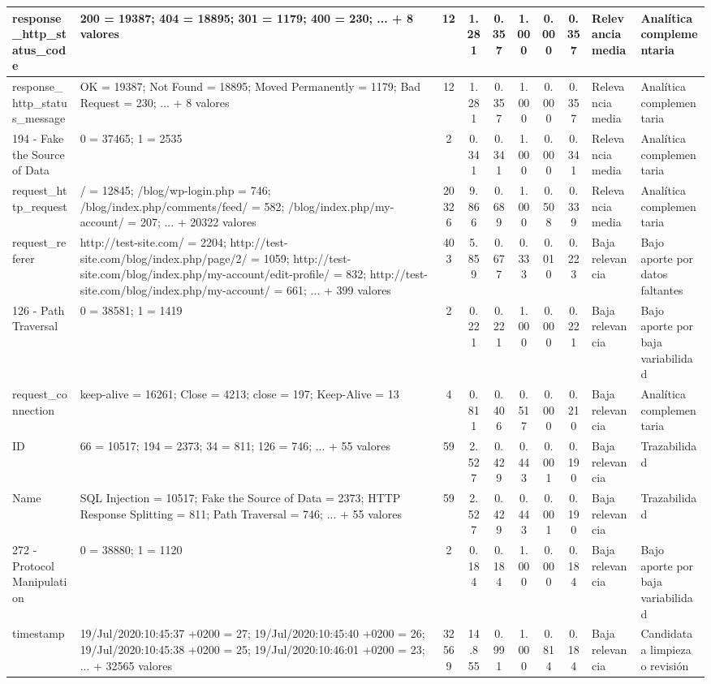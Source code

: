 \begin{table}[h]
\begin{tabular}{|p{2.1cm}|p{3.0cm}|c|c|c|c|c|c|p{2.5cm}|p{2.8cm}|}
\hline
response\_http\_status\_code & 200 = 19387; 404 = 18895; 301 = 1179; 400 = 230; ... + 8 valores & 12 & 1.281 & 0.357 & 1.000 & 0.000 & 0.357 & Relevancia media & Analítica complementaria \\
\hline
response\_http\_status\_message & OK = 19387; Not Found = 18895; Moved Permanently = 1179; Bad Request = 230; ... + 8 valores & 12 & 1.281 & 0.357 & 1.000 & 0.000 & 0.357 & Relevancia media & Analítica complementaria \\
\hline
194 - Fake the Source of Data & 0 = 37465; 1 = 2535 & 2 & 0.341 & 0.341 & 1.000 & 0.000 & 0.341 & Relevancia media & Analítica complementaria \\
\hline
request\_http\_request & / = 12845; /blog/wp-login.php = 746; /blog/index.php/comments/feed/ = 582; /blog/index.php/my-account/ = 207; ... + 20322 valores & 20326 & 9.866 & 0.689 & 1.000 & 0.508 & 0.339 & Relevancia media & Analítica complementaria \\
\hline
request\_referer & http://test-site.com/ = 2204; http://test-site.com/blog/index.php/page/2/ = 1059; http://test-site.com/blog/index.php/my-account/edit-profile/ = 832; http://test-site.com/blog/index.php/my-account/ = 661; ... + 399 valores & 403 & 5.859 & 0.677 & 0.333 & 0.010 & 0.223 & Baja relevancia & Bajo aporte por datos faltantes \\
\hline
126 - Path Traversal & 0 = 38581; 1 = 1419 & 2 & 0.221 & 0.221 & 1.000 & 0.000 & 0.221 & Baja relevancia & Bajo aporte por baja variabilidad \\
\hline
request\_connection & keep-alive = 16261; Close = 4213; close = 197; Keep-Alive = 13 & 4 & 0.811 & 0.406 & 0.517 & 0.000 & 0.210 & Baja relevancia & Analítica complementaria \\
\hline
ID & 66 = 10517; 194 = 2373; 34 = 811; 126 = 746; ... + 55 valores & 59 & 2.527 & 0.429 & 0.443 & 0.001 & 0.190 & Baja relevancia & Trazabilidad \\
\hline
Name & SQL Injection = 10517; Fake the Source of Data = 2373; HTTP Response Splitting = 811; Path Traversal = 746; ... + 55 valores & 59 & 2.527 & 0.429 & 0.443 & 0.001 & 0.190 & Baja relevancia & Trazabilidad \\
\hline
272 - Protocol Manipulation & 0 = 38880; 1 = 1120 & 2 & 0.184 & 0.184 & 1.000 & 0.000 & 0.184 & Baja relevancia & Bajo aporte por baja variabilidad \\
\hline
timestamp & 19/Jul/2020:10:45:37 +0200 = 27; 19/Jul/2020:10:45:40 +0200 = 26; 19/Jul/2020:10:45:38 +0200 = 25; 19/Jul/2020:10:46:01 +0200 = 23; ... + 32565 valores & 32569 & 14.855 & 0.991 & 1.000 & 0.814 & 0.184 & Baja relevancia & Candidata a limpieza o revisión \\

\end{tabular}
\end{table}
